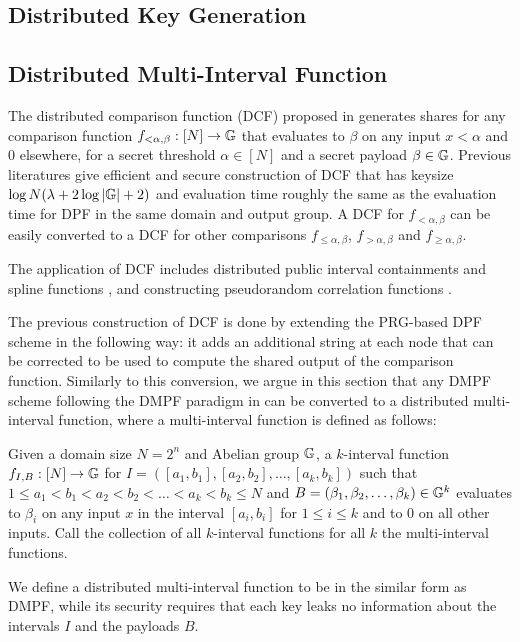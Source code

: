 \subsection{Distributed Key Generation}

\subsection{Distributed Multi-Interval Function}
The distributed comparison function (DCF) proposed in  generates shares for any comparison function $f_{<\alpha, \beta}:[N]\rightarrow \mathbb{G}$ that evaluates to $\beta$ on any input $x<\alpha$ and 0 elsewhere, for a secret threshold $\alpha\in[N]$ and a secret payload $\beta\in \mathbb{G}$. Previous literatures give efficient and secure construction of DCF that has keysize $\log N(\lambda+2\log |\mathbb{G}|+2)$ and evaluation time roughly the same as the evaluation time for DPF in the same domain and output group. A DCF for $f_{<\alpha, \beta}$ can be easily converted to a DCF for other comparisons $f_{\le \alpha, \beta}$, $f_{>\alpha,\beta}$ and $f_{\ge \alpha,\beta}$. 

The application of DCF includes distributed public interval containments and spline functions \cite{cryptoeprint:2020/1392,cryptoeprint:2019/1095}, and constructing pseudorandom correlation functions \cite{cryptoeprint:2022/1014}. 


The previous construction of DCF is done by extending the PRG-based DPF scheme in the following way: it adds an additional string at each node that can be corrected to be used to compute the shared output of the comparison function. Similarly to this conversion, we argue in this section that any DMPF scheme following the DMPF paradigm in  can be converted to a distributed multi-interval function, where a multi-interval function is defined as follows: 
\begin{definition}
  Given a domain size $N=2^n$ and Abelian group $\mathbb{G}$, a $k$-interval function $f_{I,B}:[N]\rightarrow \mathbb{G}$ for $I = \left([a_1,b_1], [a_2,b_2], \dots, [a_k,b_k]\right)$ such that $1\le a_1<b_1<a_2<b_2<\dots<a_k<b_k\le N$ and $B = (\beta_1,\beta_2,\dots,\beta_k)\in \mathbb{G}^k$ evaluates to $\beta_i$ on any input $x$ in the interval $[a_i,b_i]$ for $1\le i\le k$ and to $0$ on all other inputs. Call the collection of all $k$-interval functions for all $k$ the multi-interval functions. 
\end{definition}
We define a distributed multi-interval function to be in the similar form as DMPF, while its security requires that each key leaks no information about the intervals $I$ and the payloads $B$. 


